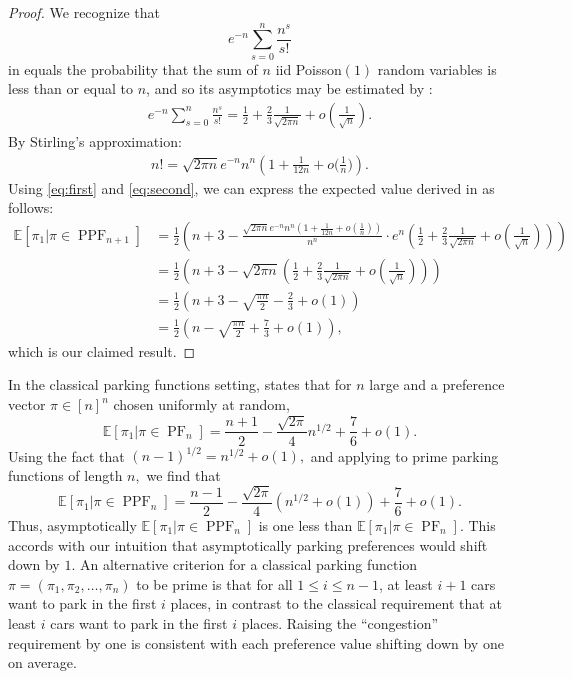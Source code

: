 \documentclass[12pt,reqno]{amsart}
\theoremstyle{definition}
\newcommand{\E}{\mathbb{E}}
\theoremstyle{remark}
\DeclareMathOperator{\PF}{PF}
\DeclareMathOperator{\PPF}{PPF}
\begin{document}
\begin{proof}
We recognize that
\begin{equation*}
e^{-n} \sum_{s=0}^{n} \frac{n^s}{s!}
\end{equation*}
in  equals the probability that the sum of $n$ iid Poisson$(1)$ random variables is less than or equal to $n$, and so its asymptotics may be estimated by :
\begin{align}
e^{-n} \sum_{s=0}^n \frac{n^s}{s!} = \frac{1}{2}+\frac{2}{3}\frac{1}{\sqrt{2\pi n}}+o\left(\frac{1}{\sqrt{n}}\right).\label{eq:first}
\end{align}
By Stirling's approximation:
\begin{align} n!= \sqrt{2\pi n} e^{-n} n^n \left(1+\frac{1}{12n}+ o\Big(\frac{1}{n}\Big)\right).\label{eq:second}
\end{align}
Using \eqref{eq:first} and \eqref{eq:second}, we can express the expected value derived in  as follows: 
\begin{align}
\E[ \pi_1 | \pi \in \PPF_{n+1}] &= \frac12 \left ( n+3 -\frac{\sqrt{2\pi n} e^{-n}n^n \left ( 1 + \frac {1}{12n}+ o\left (\frac{1}{n} \right ) \right )}{n^n} \cdot e^n \left (\frac12+\frac23 \frac{1}{\sqrt{2\pi n}}+ o\left (\frac{1}{\sqrt{n}}\right )
\right )\right ) \nonumber
\\
 &= \frac12 \left (n+3 -\sqrt{2\pi n} \left ( \frac12 + \frac23\frac{1}{\sqrt{2\pi n}} + o\left (\frac{1}{\sqrt{n}} \right ) \right ) \right )  \nonumber\\
& = \frac12 \left (n+3 -\sqrt{\frac{\pi n}{2}} - \frac23 + o(1) \right ) \nonumber\\
&= \frac12 \left (n-\sqrt{\frac{\pi n}{2}} + \frac73 + o(1) \right ), \nonumber 
\end{align}
which is our claimed result.
\end{proof}

In the classical parking functions setting,
\cite[Theorem 4]{durmic2022probabilistic} states that for $n$ large and a preference vector $\pi\in[n]^n$ chosen uniformly at random,
\[\E[\pi_1|\pi\in\PF_n]=\frac{n+1}{2}-\frac{\sqrt{2\pi}}{4}n^{1/2}+\frac76+o(1).\]
Using the fact that $(n-1)^{1/2}=n^{1/2}+o(1),$ and applying  to prime parking functions of length $n,$ we find that \[\E[\pi_1|\pi\in \PPF_n]=\frac{n-1}{2}-\frac{\sqrt{2\pi}}{4}(n^{1/2}+o(1))+\frac{7}{6}+o(1).\]  
Thus, asymptotically $\E[\pi_1|\pi\in \PPF_n]$ is one less than $\E[\pi_1|\pi\in \PF_n]$. This accords with our intuition that asymptotically parking preferences would shift down by $1$. An alternative criterion for a classical parking function $\pi=(\pi_1, \pi_2,\dots, \pi_n)$ to be prime is that for all $1\leq i\leq n-1$, at least $i+1$ cars want to park in the first $i$ places, in contrast to the classical requirement that at least $i$ cars want to park in the first $i$ places. Raising the ``congestion'' requirement by one is consistent with each preference value shifting down by one on average.
\end{document}
